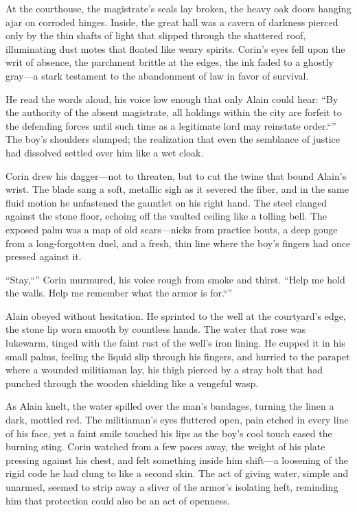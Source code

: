 \documentclass[11pt,twoside]{book}
\begin{document}
At the courthouse, the magistrate's seals lay broken, the heavy oak doors hanging ajar on corroded hinges.  Inside, the great hall was a cavern of darkness pierced only by the thin shafts of light that slipped through the shattered roof, illuminating dust motes that floated like weary spirits.  Corin's eyes fell upon the writ of absence, the parchment brittle at the edges, the ink faded to a ghostly gray---a stark testament to the abandonment of law in favor of survival.

He read the words aloud, his voice low enough that only Alain could hear: ``By the authority of the absent magistrate, all holdings within the city are forfeit to the defending forces until such time as a legitimate lord may reinstate order.``'' The boy's shoulders slumped; the realization that even the semblance of justice had dissolved settled over him like a wet cloak.

Corin drew his dagger---not to threaten, but to cut the twine that bound Alain's wrist.  The blade sang a soft, metallic sigh as it severed the fiber, and in the same fluid motion he unfastened the gauntlet on his right hand.  The steel clanged against the stone floor, echoing off the vaulted ceiling like a tolling bell.  The exposed palm was a map of old scars---nicks from practice bouts, a deep gouge from a long-forgotten duel, and a fresh, thin line where the boy's fingers had once pressed against it.

``Stay,``'' Corin murmured, his voice rough from smoke and thirst. ``Help me hold the walls. Help me remember what the armor is for.``''

Alain obeyed without hesitation.  He sprinted to the well at the courtyard's edge, the stone lip worn smooth by countless hands.  The water that rose was lukewarm, tinged with the faint rust of the well's iron lining.  He cupped it in his small palms, feeling the liquid slip through his fingers, and hurried to the parapet where a wounded militiaman lay, his thigh pierced by a stray bolt that had punched through the wooden shielding like a vengeful wasp.

As Alain knelt, the water spilled over the man's bandages, turning the linen a dark, mottled red.  The militiaman's eyes fluttered open, pain etched in every line of his face, yet a faint smile touched his lips as the boy's cool touch eased the burning sting.  Corin watched from a few paces away, the weight of his plate pressing against his chest, and felt something inside him shift---a loosening of the rigid code he had clung to like a second skin.  The act of giving water, simple and unarmed, seemed to strip away a sliver of the armor's isolating heft, reminding him that protection could also be an act of openness.
\end{document}
